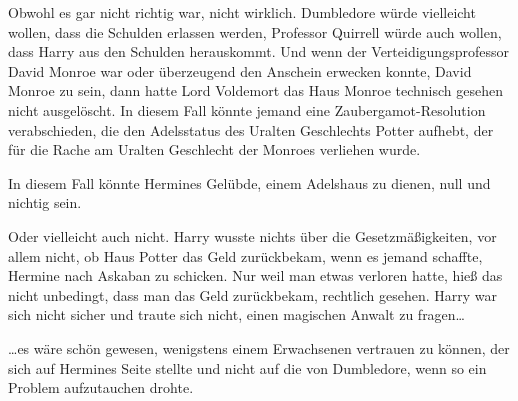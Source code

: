 Obwohl es gar nicht richtig war, nicht wirklich. Dumbledore würde vielleicht wollen, dass die Schulden erlassen werden, Professor Quirrell würde auch wollen, dass Harry aus den Schulden herauskommt. Und wenn der Verteidigungsprofessor David Monroe war oder überzeugend den Anschein erwecken konnte, David Monroe zu sein, dann hatte Lord Voldemort das Haus Monroe technisch gesehen nicht ausgelöscht. In diesem Fall könnte jemand eine Zaubergamot-Resolution verabschieden, die den Adelsstatus des Uralten Geschlechts Potter aufhebt, der für die Rache am Uralten Geschlecht der Monroes verliehen wurde.

In diesem Fall könnte Hermines Gelübde, einem Adelshaus zu dienen, null und nichtig sein.

Oder vielleicht auch nicht. Harry wusste nichts über die Gesetzmäßigkeiten, vor allem nicht, ob Haus Potter das Geld zurückbekam, wenn es jemand schaffte, Hermine nach Askaban zu schicken. Nur weil man etwas verloren hatte, hieß das nicht unbedingt, dass man das Geld zurückbekam, rechtlich gesehen. Harry war sich nicht sicher und traute sich nicht, einen magischen Anwalt zu fragen…

…es wäre schön gewesen, wenigstens einem Erwachsenen vertrauen zu können, der sich auf Hermines Seite stellte und nicht auf die von Dumbledore, wenn so ein Problem aufzutauchen drohte.


